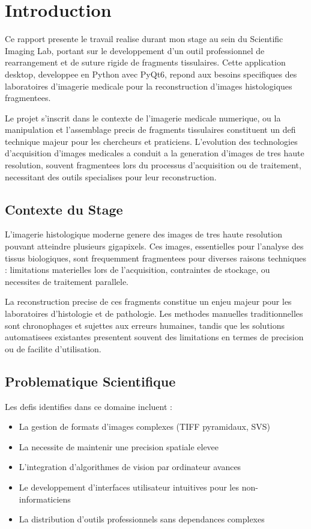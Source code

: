 \documentclass[12pt,a4paper]{article}
\begin{document}
\section{Introduction}

Ce rapport presente le travail realise durant mon stage au sein du Scientific Imaging Lab, portant sur le developpement d'un outil professionnel de rearrangement et de suture rigide de fragments tissulaires. Cette application desktop, developpee en Python avec PyQt6, repond aux besoins specifiques des laboratoires d'imagerie medicale pour la reconstruction d'images histologiques fragmentees.

Le projet s'inscrit dans le contexte de l'imagerie medicale numerique, ou la manipulation et l'assemblage precis de fragments tissulaires constituent un defi technique majeur pour les chercheurs et praticiens. L'evolution des technologies d'acquisition d'images medicales a conduit a la generation d'images de tres haute resolution, souvent fragmentees lors du processus d'acquisition ou de traitement, necessitant des outils specialises pour leur reconstruction.

\subsection{Contexte du Stage}

L'imagerie histologique moderne genere des images de tres haute resolution pouvant atteindre plusieurs gigapixels. Ces images, essentielles pour l'analyse des tissus biologiques, sont frequemment fragmentees pour diverses raisons techniques : limitations materielles lors de l'acquisition, contraintes de stockage, ou necessites de traitement parallele.

La reconstruction precise de ces fragments constitue un enjeu majeur pour les laboratoires d'histologie et de pathologie. Les methodes manuelles traditionnelles sont chronophages et sujettes aux erreurs humaines, tandis que les solutions automatisees existantes presentent souvent des limitations en termes de precision ou de facilite d'utilisation.

\subsection{Problematique Scientifique}

Les defis identifies dans ce domaine incluent :

\begin{itemize}
\item La gestion de formats d'images complexes (TIFF pyramidaux, SVS)
\item La necessite de maintenir une precision spatiale elevee
\item L'integration d'algorithmes de vision par ordinateur avances
\item Le developpement d'interfaces utilisateur intuitives pour les non-informaticiens
\item La distribution d'outils professionnels sans dependances complexes
\end{itemize}
\end{document}
